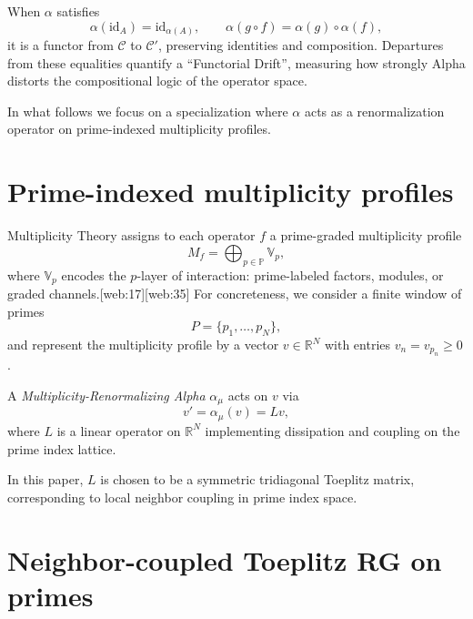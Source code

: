 \documentclass[11pt]{article}
\begin{document}
When $\alpha$ satisfies
\begin{equation}
    \alpha(\mathrm{id}_A) = \mathrm{id}_{\alpha(A)}, \qquad
    \alpha(g \circ f) = \alpha(g) \circ \alpha(f),
\end{equation}
it is a functor from $\mathcal{C}$ to $\mathcal{C}'$, preserving identities and composition.
Departures from these equalities quantify a ``Functorial Drift'', measuring how strongly Alpha distorts the compositional logic of the operator space.

In what follows we focus on a specialization where $\alpha$ acts as a renormalization operator on prime-indexed multiplicity profiles.

\section{Prime-indexed multiplicity profiles}

Multiplicity Theory assigns to each operator $f$ a prime-graded multiplicity profile
\begin{equation}
    M_f = \bigoplus_{p \in \mathbb{P}} \mathbb{V}_p,
\end{equation}
where $\mathbb{V}_p$ encodes the $p$-layer of interaction: prime-labeled factors, modules, or graded channels.[web:17][web:35]
For concreteness, we consider a finite window of primes
\[
    P = \{p_1, \dots, p_N\},
\]
and represent the multiplicity profile by a vector $v \in \mathbb{R}^N$ with entries $v_n = v_{p_n} \ge 0$.

\begin{definition}
A \emph{Multiplicity-Renormalizing Alpha} $\alpha_\mu$ acts on $v$ via
\begin{equation}
    v' = \alpha_\mu(v) = L v,
\end{equation}
where $L$ is a linear operator on $\mathbb{R}^N$ implementing dissipation and coupling on the prime index lattice.
\end{definition}

In this paper, $L$ is chosen to be a symmetric tridiagonal Toeplitz matrix, corresponding to local neighbor coupling in prime index space.

\section{Neighbor-coupled Toeplitz RG on primes}
\end{document}
